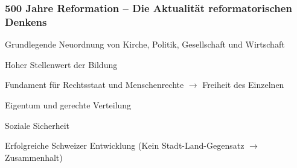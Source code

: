 \documentclass[10pt, openright=true]{scrartcl}
\begin{document}
\subsubsection{500 Jahre Reformation – Die Aktualität reformatorischen Denkens}
\begin{citemize}
	\item Grundlegende Neuordnung von Kirche, Politik, Gesellschaft und Wirtschaft
	\item Hoher Stellenwert der Bildung
	\item Fundament für Rechtsstaat und Menschenrechte $ \rightarrow $ Freiheit des Einzelnen
	\item Eigentum und gerechte Verteilung
	\item Soziale Sicherheit
	\item Erfolgreiche Schweizer Entwicklung (Kein Stadt-Land-Gegensatz $ \rightarrow $ Zusammenhalt)
\end{citemize}
\end{document}
